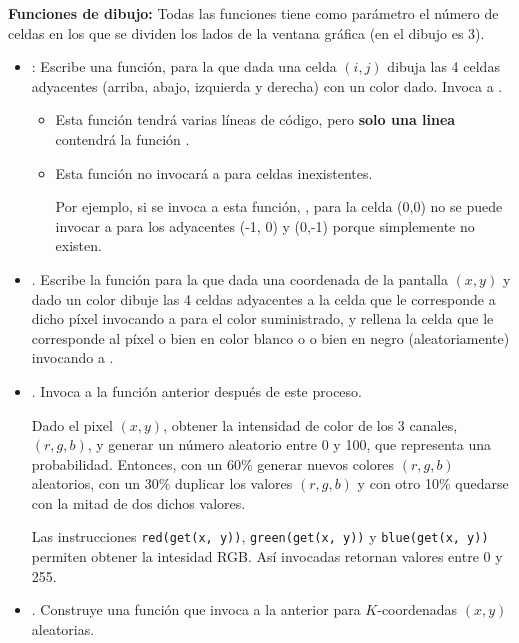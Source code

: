 {\bf Funciones de dibujo:} Todas las funciones tiene como parámetro el número de celdas en los que se dividen los lados de la ventana gráfica (en el dibujo es 3).
\begin{itemize}
\item {}: Escribe una función, para la que dada una celda $(i,j)$ dibuja las 4 celdas adyacentes (arriba, abajo, izquierda y derecha) con un color dado.
	Invoca a .
	
	\begin{itemize} 
	\item Esta función tendrá varias líneas de código, pero {\bf solo una linea} contendrá la función .
	\item Esta función no invocará a   para celdas inexistentes. 
	
	Por ejemplo, si se invoca a esta función, , para la celda (0,0) no se puede invocar a  para los adyacentes (-1, 0) y (0,-1) porque simplemente no existen.
	\end{itemize}
	
		
\item {}. Escribe la función para la que dada una coordenada de la pantalla $(x, y)$ y dado un color dibuje las 4 celdas adyacentes a la celda que le corresponde a dicho píxel invocando a  para el color suministrado, y rellena la celda que le corresponde al píxel o bien en color blanco o o bien en negro (aleatoriamente) invocando a .

\item {}. Invoca a la función anterior después de este proceso.

Dado el pixel  $(x,y)$, obtener  la intensidad de color de los 3 canales, $(r, g,b)$, y generar un número aleatorio entre 0 y 100, que representa una probabilidad.
Entonces, con un 60\% generar nuevos colores  $(r, g,b)$ aleatorios, con un 30\% duplicar los valores $(r, g,b)$ y con otro 10\% quedarse con la mitad de dos dichos valores.

	Las instrucciones {\tt red(get(x, y))}, {\tt green(get(x, y))} y {\tt blue(get(x, y))} permiten obtener la intesidad RGB. Así invocadas retornan valores entre 0 y 255.
	
\item {}. Construye una función que invoca a la anterior para $K$-coordenadas $(x, y)$ aleatorias.

\end{itemize}

